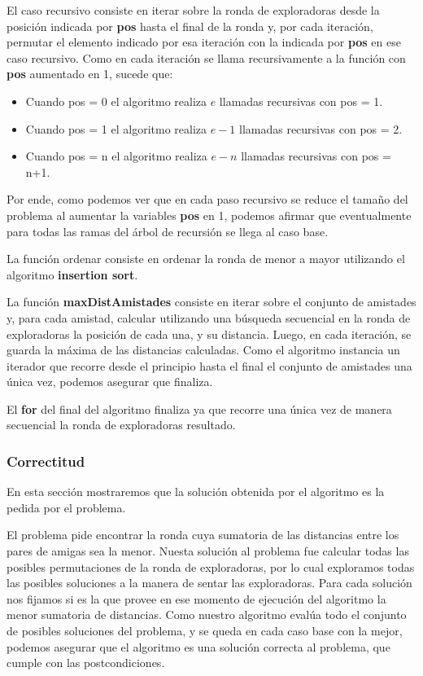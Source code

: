 \documentclass[11pt]{article}
\begin{document}
El caso recursivo consiste en iterar sobre la ronda de exploradoras desde la posición indicada por \textbf{pos} 
hasta el final de la ronda y, por cada iteración, permutar el elemento indicado por esa iteración con la indicada por 
\textbf{pos} en ese caso recursivo. 
Como en cada iteración se llama recursivamente a la función con \textbf{pos} aumentado en 1, sucede que:

\begin{itemize}
\item Cuando pos = 0 el algoritmo realiza $e$ llamadas recursivas con pos = 1.
\item Cuando pos = 1 el algoritmo realiza $e-1$ llamadas recursivas con pos = 2.
\item Cuando pos = n el algoritmo realiza $e-n$ llamadas recursivas con pos = n+1.
\end{itemize}

Por ende, como podemos ver que en cada paso recursivo se reduce el tamaño del problema al aumentar la variables 
\textbf{pos} en 1, podemos afirmar que eventualmente para todas las ramas del árbol de recursión se llega al caso base.

La función ordenar consiste en ordenar la ronda de menor a mayor utilizando el algoritmo \textbf{insertion sort}.

La función \textbf{maxDistAmistades} consiste en iterar sobre el conjunto de amistades y, para cada amistad, 
calcular utilizando una búsqueda secuencial en la ronda de exploradoras la posición de cada una, y su distancia.
Luego, en cada iteración, se guarda la máxima de las distancias calculadas.
Como el algoritmo instancia un iterador que recorre desde el principio hasta el final el conjunto de amistades 
una única vez, podemos asegurar que finaliza.

El \textbf{for} del final del algoritmo finaliza ya que recorre una única vez de manera secuencial la ronda 
de exploradoras resultado.

\subsubsection{Correctitud}

En esta sección mostraremos que la solución obtenida por el algoritmo es la pedida por el problema. 

El problema pide encontrar la ronda cuya sumatoria de las distancias entre los pares de amigas sea la menor.
Nuesta solución al problema fue calcular todas las posibles permutaciones de la ronda de exploradoras, por lo cual 
exploramos todas las posibles soluciones a la manera de sentar las exploradoras. Para cada solución nos fijamos 
si es la que provee en ese momento de ejecución del algoritmo la menor sumatoria de distancias. Como nuestro 
algoritmo evalúa todo el conjunto de posibles soluciones del problema, y se queda en cada caso base con la mejor,
podemos asegurar que el algoritmo es una solución correcta al problema, que cumple con las postcondiciones.
\end{document}
